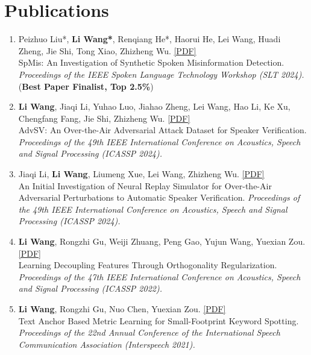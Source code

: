 \documentclass{resume}
\begin{document}
\section{Publications}
\begin{enumerate}\itemsep 0.5em
  \item Peizhuo Liu*, \textbf{Li Wang*}, Renqiang He*, Haorui He, Lei Wang, Huadi Zheng, Jie Shi, Tong Xiao, Zhizheng Wu. \href{https://arxiv.org/abs/2409.11308}{[PDF]} \\SpMis: An Investigation of Synthetic Spoken Misinformation Detection. \textit{Proceedings of the IEEE Spoken Language Technology Workshop (SLT 2024).} (\textbf{Best Paper Finalist, Top 2.5\%})
  \item \textbf{Li Wang}, Jiaqi Li, Yuhao Luo, Jiahao Zheng, Lei Wang, Hao Li, Ke Xu, Chengfang Fang, Jie Shi, Zhizheng Wu. \href{https://arxiv.org/abs/2310.05369}{[PDF]} \\AdvSV: An Over-the-Air Adversarial Attack Dataset for Speaker Verification. \textit{Proceedings of the 49th IEEE International Conference on Acoustics, Speech and Signal Processing (ICASSP 2024).}
 \item Jiaqi Li, \textbf{Li Wang}, Liumeng Xue, Lei Wang, Zhizheng Wu. \href{https://arxiv.org/abs/2310.05354}{[PDF]} \\An Initial Investigation of Neural Replay Simulator for Over-the-Air Adversarial Perturbations to Automatic Speaker Verification. \textit{Proceedings of the 49th IEEE International Conference on Acoustics, Speech and Signal Processing (ICASSP 2024).}
  \item \textbf{Li Wang}, Rongzhi Gu, Weiji Zhuang, Peng Gao, Yujun Wang, Yuexian Zou. \href{https://ieeexplore.ieee.org/document/9747878}{[PDF]} \\Learning Decoupling Features Through Orthogonality Regularization. \textit{Proceedings of the 47th IEEE International Conference on Acoustics, Speech and Signal Processing (ICASSP 2022).}
  \item \textbf{Li Wang}, Rongzhi Gu, Nuo Chen, Yuexian Zou. \href{https://www.isca-speech.org/archive/interspeech_2021/wang21da_interspeech.html}{[PDF]} \\ Text Anchor Based Metric Learning for Small-Footprint Keyword Spotting. \textit{Proceedings of the 22nd Annual Conference of the International Speech Communication Association (Interspeech 2021).}

\end{enumerate}
\end{document}
